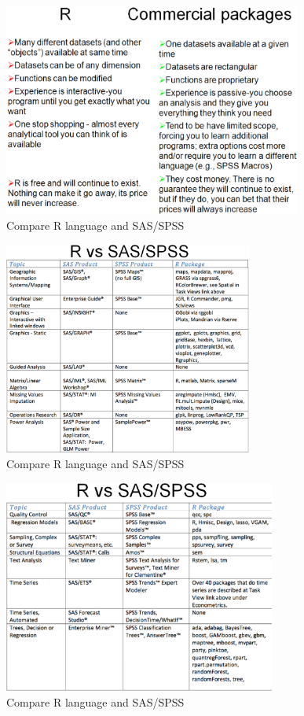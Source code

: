 \begin{figure}[htb]
    \centerline{\includegraphics[height=7cm]{./images/R_SPSS_1.eps}}
    \caption{Compare R language and SAS/SPSS}\label{fig:R_SPSS_1}
\end{figure}
\begin{figure}[htb]
  \centerline{\includegraphics[height=7cm]{./images/R_SPSS_2.eps}}
  \caption{Compare R language and SAS/SPSS}\label{fig:R_SPSS_2}
\end{figure}
\begin{figure}[htb]
  \centerline{\includegraphics[height=7cm]{./images/R_SPSS_3.eps}}
  \caption{Compare R language and SAS/SPSS}\label{fig:R_SPSS_3}
\end{figure}



